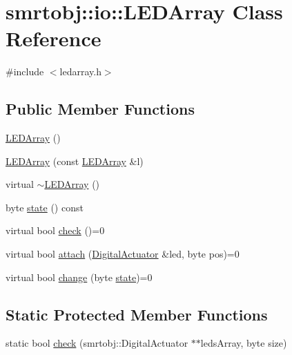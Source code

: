 \hypertarget{classsmrtobj_1_1io_1_1_l_e_d_array}{}\section{smrtobj\+:\+:io\+:\+:L\+E\+D\+Array Class Reference}
\label{classsmrtobj_1_1io_1_1_l_e_d_array}


{\ttfamily \#include $<$ledarray.\+h$>$}

\subsection*{Public Member Functions}
\begin{DoxyCompactItemize}
\item 
\hyperlink{classsmrtobj_1_1io_1_1_l_e_d_array_a456586cf665e9234fe5f9ba8a5e1afe7}{L\+E\+D\+Array} ()
\item 
\hyperlink{classsmrtobj_1_1io_1_1_l_e_d_array_a19b9dc0968a0df61ebff839855822c4a}{L\+E\+D\+Array} (const \hyperlink{classsmrtobj_1_1io_1_1_l_e_d_array}{L\+E\+D\+Array} \&l)
\item 
virtual \hyperlink{classsmrtobj_1_1io_1_1_l_e_d_array_aba3c59eefd537c438ab1684dfe09fca7}{$\sim$\+L\+E\+D\+Array} ()
\item 
byte \hyperlink{classsmrtobj_1_1io_1_1_l_e_d_array_acf2fc05accc35053a7d7987aeb9e4bed}{state} () const 
\item 
virtual bool \hyperlink{classsmrtobj_1_1io_1_1_l_e_d_array_a7fda2a4c901cf158beb7dc0e3c57cbe9}{check} ()=0
\item 
virtual bool \hyperlink{classsmrtobj_1_1io_1_1_l_e_d_array_a22376f08e9efc09bcb7a28fd797b8161}{attach} (\hyperlink{classsmrtobj_1_1io_1_1_digital_actuator}{Digital\+Actuator} \&led, byte pos)=0
\item 
virtual bool \hyperlink{classsmrtobj_1_1io_1_1_l_e_d_array_aaab58b896ed1ffafa272e7813d60d2bf}{change} (byte \hyperlink{classsmrtobj_1_1io_1_1_l_e_d_array_acf2fc05accc35053a7d7987aeb9e4bed}{state})=0
\end{DoxyCompactItemize}
\subsection*{Static Protected Member Functions}
\begin{DoxyCompactItemize}
\item 
static bool \hyperlink{classsmrtobj_1_1io_1_1_l_e_d_array_a162ff9d95114881a017bd7f11d3e1ac6}{check} (smrtobj\+::\+Digital\+Actuator $\ast$$\ast$leds\+Array, byte size)
\end{DoxyCompactItemize}
